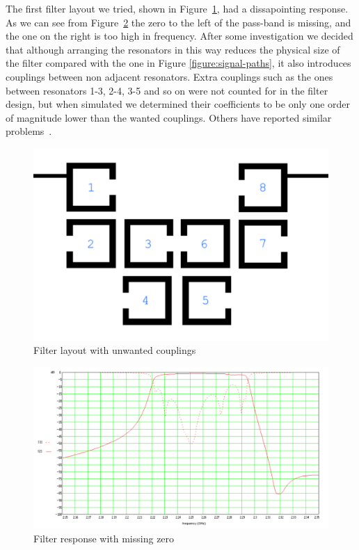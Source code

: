 The first filter layout we tried, shown in Figure~\ref{figure:filter-missing-zero-layout}, had a dissapointing response. As we can see from Figure~\ref{figure:filter-missing-zero-response} the zero to the left of the pass-band is missing, and the one on the right is too high in frequency. After some investigation we decided that although arranging the resonators in this way reduces the physical size of the filter compared with the one in Figure \ref{figure:signal-paths}, it also introduces couplings between non adjacent resonators. Extra couplings such as the ones between resonators 1-3, 2-4, 3-5 and so on were not counted for in the filter design, but when simulated we determined their coefficients to be only one order of magnitude lower than the wanted couplings. Others have reported similar problems~\cite{hong:performance}. 

\begin{figure}[ht]
\begin{center}
\includegraphics[scale=0.4]{fig/design-bad-8-pole-layout.pdf}
\end{center}
\caption{Filter layout with unwanted couplings}
\label{figure:filter-missing-zero-layout}
\end{figure}

\begin{figure}[ht]
\hspace{-4em}
\includegraphics[scale=0.4]{fig/design-bad-8-pole-response.pdf}
\caption{Filter response with missing zero}
\label{figure:filter-missing-zero-response}
\end{figure}

